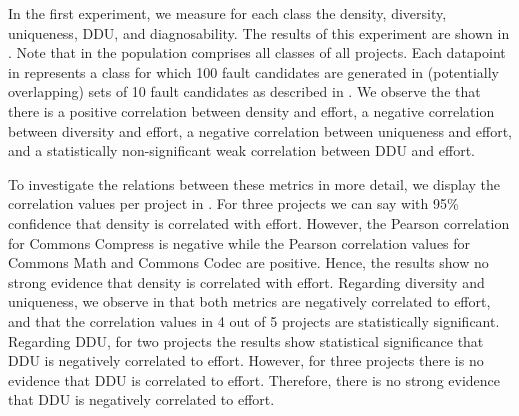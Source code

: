 \documentclass[twoside,a4paper,11pt]{memoir}
\begin{document}
In the first experiment, we measure for each class the density, diversity, uniqueness, DDU, and diagnosability.
The results of this experiment are shown in .
Note that in  the population comprises all classes of all projects.
Each datapoint in  represents a class for which 100 fault candidates are generated in (potentially overlapping) sets of 10 fault candidates as described in .
We observe the that there is a positive correlation between density and effort, a negative correlation between diversity and effort, a negative correlation between uniqueness and effort, and a statistically non-significant weak correlation between DDU and effort.

To investigate the relations between these metrics in more detail, we display the correlation values per project in .
For three projects we can say with 95\% confidence that density is correlated with effort.
However, the Pearson correlation for Commons Compress is negative while the Pearson correlation values for Commons Math and Commons Codec are positive.
Hence, the results show no strong evidence that density is correlated with effort.
Regarding diversity and uniqueness, we observe in  that both metrics are negatively correlated to effort, and that the correlation values in 4 out of 5 projects are statistically significant.
Regarding DDU, for two projects the results show statistical significance that DDU is negatively correlated to effort.
However, for three projects there is no evidence that DDU is correlated to effort.
Therefore, there is no strong evidence that DDU is negatively correlated to effort.
\end{document}
